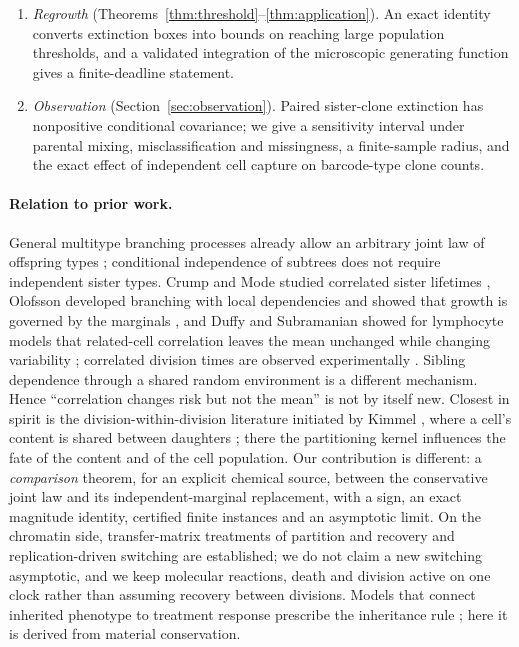 \documentclass[11pt]{article}
\theoremstyle{remark}
\begin{document}
\begin{enumerate}
readout that is subcritical on the symmetry line, survival from founders
within $O(N^{-1/2})$ of that line is at most $O(N^{-\gamma}(\log N)^{3/2})$
with an explicit $\gamma>0$, in both models. The proof is a first-moment
(many-to-one) argument and uses no population coupling.
\item \emph{Regrowth} (Theorems~\ref{thm:threshold}--\ref{thm:application}).
An exact identity converts extinction boxes into bounds on reaching large
population thresholds, and a validated integration of the microscopic
generating function gives a finite-deadline statement.
\item \emph{Observation} (Section~\ref{sec:observation}). Paired sister-clone
extinction has nonpositive conditional covariance; we give a sensitivity
interval under parental mixing, misclassification and missingness, a
finite-sample radius, and the exact effect of independent cell capture on
barcode-type clone counts.
\end{enumerate}

\paragraph{Relation to prior work.}
General multitype branching processes already allow an arbitrary joint law of
offspring types \cite{athreya1972,kimmel2015}; conditional independence of
subtrees does not require independent sister types. Crump and Mode studied
correlated sister lifetimes \cite{crump1969}, Olofsson developed branching
with local dependencies and showed that growth is governed by the marginals
\cite{olofsson1996}, and Duffy and Subramanian showed for lymphocyte models
that related-cell correlation leaves the mean unchanged while changing
variability \cite{duffy2009}; correlated division times are observed
experimentally \cite{sandler2015}. Sibling dependence through a shared random
environment \cite{vatutin2020} is a different mechanism. Hence ``correlation
changes risk but not the mean'' is not by itself new. Closest in spirit is the
division-within-division literature initiated by Kimmel \cite{kimmel1997},
where a cell's content is shared between daughters
\cite{bansaye2008,bansaye2011,marguet2024}; there the partitioning kernel
influences the fate of the content and of the cell population. Our
contribution is different: a \emph{comparison} theorem, for an explicit
chemical source, between the conservative joint law and its
independent-marginal replacement, with a sign, an exact magnitude identity,
certified finite instances and an asymptotic limit. On the chromatin side,
transfer-matrix treatments of partition and recovery
\cite{micheelsen2010} and replication-driven switching \cite{movilla2025}
are established; we do not claim a new switching asymptotic, and we keep
molecular reactions, death and division active on one clock rather than
assuming recovery between divisions. Models that connect inherited phenotype
to treatment response prescribe the inheritance rule \cite{cassidy2021}; here
it is derived from material conservation.
\end{document}
